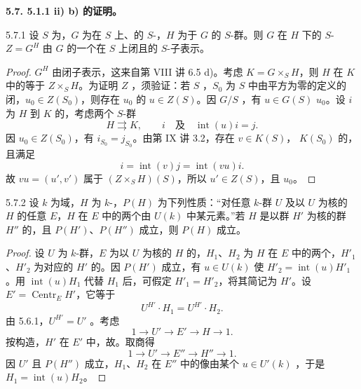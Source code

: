 \textbf{5.7. 5.1.1 ii) b) 的证明。}
\begin{SGAresult}{}{5.7.1}
设 $S$ 为，$G$ 为在 $S$ 上、的 $S$-，$H$ 为于 $G$ 的 $S$-群。则 $G$ 在 $H$ 下的 $S$- $Z=G^H$ 由 $G$ 的一个在 $S$ 上闭且的 $S$-子表示。
\end{SGAresult}
\begin{proof}
$G^H$ 由闭子表示，这来自第 VIII 讲 6.5 d)。考虑 $K=G\times_SH$，则 $H$ 在 $K$ 中的等于 $Z\times_SH$。为证明 $Z$ ，须验证：若 $S$ ，$S_0$ 为 $S$ 中由平方为零的定义的闭，$u_0\in Z(S_0)$，则存在 $u_0$ 的 $u\in Z(S)$。因 $G/S$ ，有 $u\in G(S)$  $u_0$。设 $i$ 为 $H$ 到 $K$ 的，考虑两个 $S$-群
\[H\rightrightarrows K,\qquad i\quad\text{及}\quad\operatorname{int}(u)i=j.\]
因 $u_0\in Z(S_0)$，有 $i_{S_0}=j_{S_0}$。由第 IX 讲 3.2，存在 $v\in K(S)$， $K(S_0)$ 的，且满足
\[i=\operatorname{int}(v)j=\operatorname{int}(vu)i.\]
故 $vu=(u',v')$ 属于 $(Z\times_SH)(S)$，所以 $u'\in Z(S)$，且 $u_0$。
\end{proof}
\begin{SGAresult}{}{5.7.2}
设 $k$ 为域，$H$ 为 $k$-，$P(H)$ 为下列性质：“对任意 $k$-群 $U$ 及以 $U$ 为核的 $H$ 的任意 $E$，$H$ 在 $E$ 中的两个由 $U(k)$ 中某元素。”若 $H$ 是以群 $H'$ 为核的群 $H''$ 的，且 $P(H')$、$P(H'')$ 成立，则 $P(H)$ 成立。
\end{SGAresult}
\begin{proof}
设 $U$ 为 $k$-群，$E$ 为以 $U$ 为核的 $H$ 的，$H_1$、$H_2$ 为 $H$ 在 $E$ 中的两个，$H'_1$、$H'_2$ 为对应的 $H'$ 的。因 $P(H')$ 成立，有 $u\in U(k)$ 使 $H'_2=\operatorname{int}(u)H'_1$。用 $\operatorname{int}(u)H_1$ 代替 $H_1$ 后，可假定 $H'_1=H'_2$，将其简记为 $H'$。设 $E'=\operatorname{Centr}_E H'$，它等于
\[U^{H'}\cdot H_1=U^{H'}\cdot H_2.\]
由 5.6.1，$U^{H'}=U'$ 。考虑
\[1\longrightarrow U'\longrightarrow E'\longrightarrow H\longrightarrow1.\]
按构造，$H'$ 在 $E'$ 中，故。取商得
\[1\longrightarrow U'\longrightarrow E''\longrightarrow H''\longrightarrow1.\]
因 $U'$ 且 $P(H'')$ 成立，$H_1$、$H_2$ 在 $E''$ 中的像由某个 $u\in U'(k)$ ，于是 $H_1=\operatorname{int}(u)H_2$。
\end{proof}
